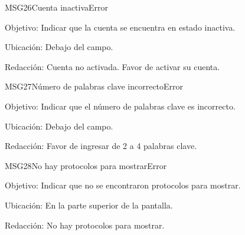 
\begin{mensaje}{MSG26}{Cuenta inactiva}{Error}
	\item[Objetivo:] Indicar que la cuenta se encuentra en estado inactiva.
	\item[Ubicación:] Debajo del campo.
	\item[Redacción:] Cuenta no activada. Favor de activar su cuenta.
\end{mensaje}

\begin{mensaje}{MSG27}{Número de palabras clave incorrecto}{Error}
	\item[Objetivo:] Indicar que el número de palabras clave es incorrecto.
	\item[Ubicación:] Debajo del campo.
	\item[Redacción:] Favor de ingresar de 2 a 4 palabras clave.
\end{mensaje}

\begin{mensaje}{MSG28}{No hay protocolos para mostrar}{Error}
	\item[Objetivo:] Indicar que no se encontraron protocolos para mostrar.
	\item[Ubicación:] En la parte superior de la pantalla.
	\item[Redacción:] No hay protocolos para mostrar.
\end{mensaje}

